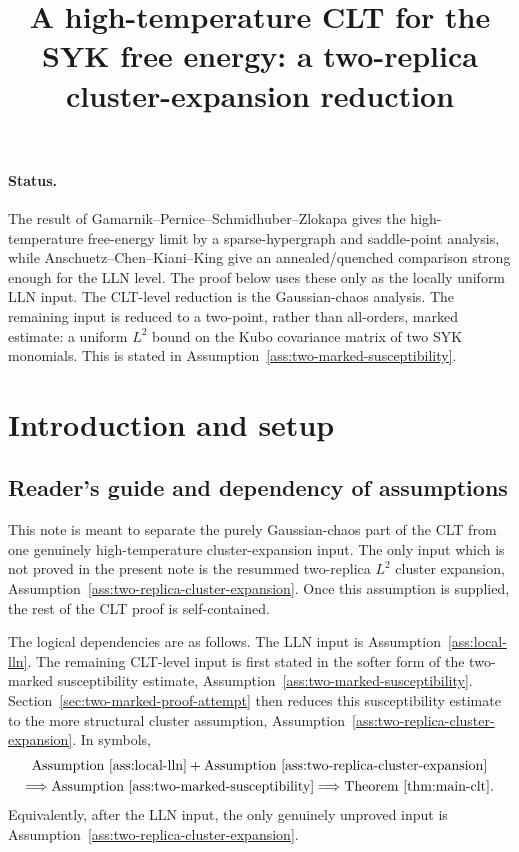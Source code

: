 \documentclass[11pt]{article}
\title{A high-temperature CLT for the SYK free energy: a two-replica cluster-expansion reduction}
\author{}
\date{}
\begin{document}
\maketitle
\paragraph{Status.}
The result of Gamarnik--Pernice--Schmidhuber--Zlokapa gives the high-temperature
free-energy limit by a sparse-hypergraph and saddle-point analysis, while
Anschuetz--Chen--Kiani--King give an annealed/quenched comparison strong enough
for the LLN level.  The proof below uses these only as the locally uniform LLN
input.  The CLT-level reduction is the Gaussian-chaos analysis.  The remaining
input is reduced to a two-point, rather than all-orders, marked estimate: a
uniform $L^2$ bound on the Kubo covariance matrix of two SYK monomials.  This is
stated in Assumption~\ref{ass:two-marked-susceptibility}.


\tableofcontents

\section{Introduction and setup}
\label{sec:introduction-setup}

\subsection{Reader's guide and dependency of assumptions}

This note is meant to separate the purely Gaussian-chaos part of the CLT from
one genuinely high-temperature cluster-expansion input.  The only input which is
not proved in the present note is the resummed two-replica $L^2$ cluster
expansion, Assumption~\ref{ass:two-replica-cluster-expansion}.  Once this
assumption is supplied, the rest of the CLT proof is self-contained.

The logical dependencies are as follows.  The LLN input is
Assumption~\ref{ass:local-lln}.  The remaining CLT-level input is first stated in
the softer form of the two-marked susceptibility estimate,
Assumption~\ref{ass:two-marked-susceptibility}.  Section~\ref{sec:two-marked-proof-attempt}
then reduces this susceptibility estimate to the more structural cluster
assumption, Assumption~\ref{ass:two-replica-cluster-expansion}.  In symbols,
\begin{equation}\label{eq:reader-main-dependency}
  \begin{gathered}
    \text{Assumption~\ref{ass:local-lln}}
    +
    \text{Assumption~\ref{ass:two-replica-cluster-expansion}}
    \\
    \Longrightarrow
    \text{Assumption~\ref{ass:two-marked-susceptibility}}
    \Longrightarrow
    \text{Theorem~\ref{thm:main-clt}}.
  \end{gathered}
\end{equation}
Equivalently, after the LLN input, the only genuinely unproved input is
Assumption~\ref{ass:two-replica-cluster-expansion}.
\end{document}
